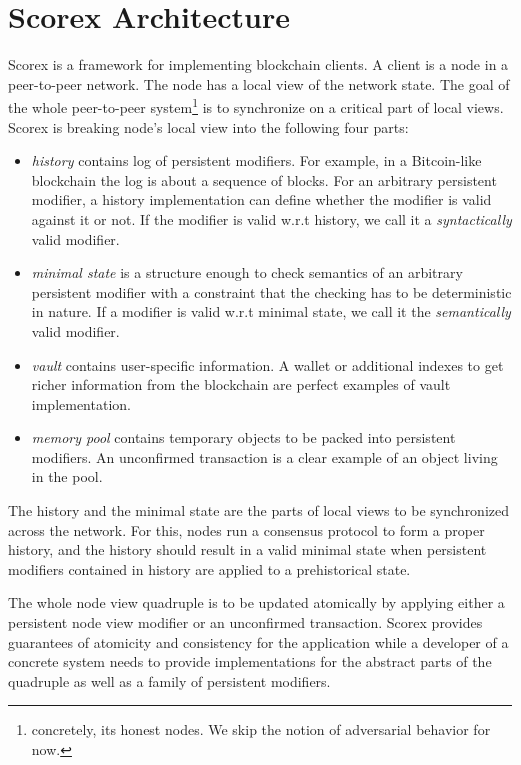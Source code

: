 
\section{Scorex Architecture}
\label{sec:scorex}

Scorex is a framework for implementing blockchain clients. A client is a node in a peer-to-peer network. The node has a local view of the network state. The goal of the whole peer-to-peer system\footnote{concretely, its honest nodes. We skip the notion of adversarial behavior for now.} is to synchronize on a critical part of local views. Scorex is breaking node's local view into the following four parts: 

\begin{itemize}
\item{\em history} contains log of persistent modifiers. For example, in a Bitcoin-like blockchain the log is about a sequence of blocks. For an arbitrary persistent modifier, a history implementation can define whether the modifier is valid against it or not.
If the modifier is valid w.r.t history, we call it a {\em syntactically} valid modifier.   
\item{\em minimal state} is a structure enough to check semantics of an arbitrary persistent modifier with a constraint that the checking has to be deterministic in nature. If a modifier is valid w.r.t minimal state, we call it the {\em semantically} valid modifier.
\item{\em vault} contains user-specific information. A wallet or additional indexes to get richer information from the blockchain are perfect examples of vault implementation. 
\item{\em memory pool} contains temporary objects to be packed into persistent modifiers. An unconfirmed transaction is a clear example of an object living in the pool.
\end{itemize}

The history and the minimal state are the parts of local views to be synchronized across the network. For this, nodes run a consensus protocol to form a proper history, and the history should result in a valid minimal state when persistent modifiers contained in history are applied to a prehistorical state.

The whole node view quadruple is to be updated atomically by applying either a persistent node view modifier or an unconfirmed transaction. Scorex provides guarantees of atomicity and consistency for the application while a developer of a concrete system needs to provide implementations for the abstract parts of the quadruple as well as a family of persistent modifiers.

